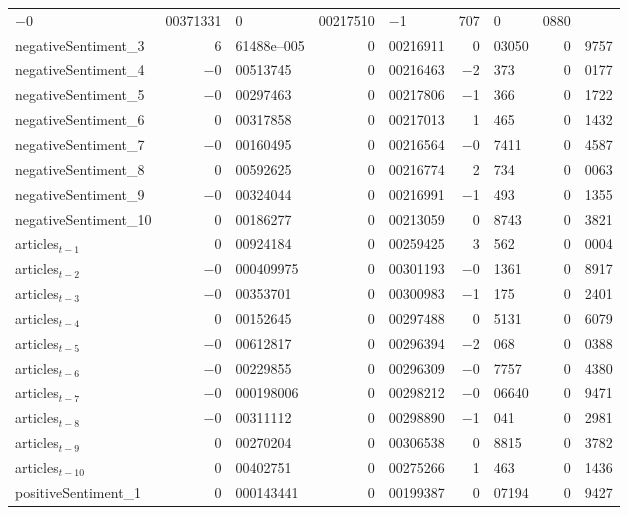 \begin{center}
\begin{longtable}{lr@{.}lr@{.}lr@{.}lr@{.}l}
    $-$0&00371331 &
    0&00217510 &
        $-$1&707 &
        0&0880 \\
negativeSentiment\_3 &
    6&61488\textrm{e--005} &
    0&00216911 &
        0&03050 &
        0&9757 \\
negativeSentiment\_4 &
    $-$0&00513745 &
    0&00216463 &
        $-$2&373 &
        0&0177 \\
negativeSentiment\_5 &
    $-$0&00297463 &
    0&00217806 &
        $-$1&366 &
        0&1722 \\
negativeSentiment\_6 &
    0&00317858 &
    0&00217013 &
        1&465 &
        0&1432 \\
negativeSentiment\_7 &
    $-$0&00160495 &
    0&00216564 &
        $-$0&7411 &
        0&4587 \\
negativeSentiment\_8 &
    0&00592625 &
    0&00216774 &
        2&734 &
        0&0063 \\
negativeSentiment\_9 &
    $-$0&00324044 &
    0&00216991 &
        $-$1&493 &
        0&1355 \\
negativeSentiment\_10 &
    0&00186277 &
    0&00213059 &
        0&8743 &
        0&3821 \\
articles$_{t-1}$ &
    0&00924184 &
    0&00259425 &
        3&562 &
        0&0004 \\
articles$_{t-2}$ &
    $-$0&000409975 &
    0&00301193 &
        $-$0&1361 &
        0&8917 \\
articles$_{t-3}$ &
    $-$0&00353701 &
    0&00300983 &
        $-$1&175 &
        0&2401 \\
articles$_{t-4}$ &
    0&00152645 &
    0&00297488 &
        0&5131 &
        0&6079 \\
articles$_{t-5}$ &
    $-$0&00612817 &
    0&00296394 &
        $-$2&068 &
        0&0388 \\
articles$_{t-6}$ &
    $-$0&00229855 &
    0&00296309 &
        $-$0&7757 &
        0&4380 \\
articles$_{t-7}$ &
    $-$0&000198006 &
    0&00298212 &
        $-$0&06640 &
        0&9471 \\
articles$_{t-8}$ &
    $-$0&00311112 &
    0&00298890 &
        $-$1&041 &
        0&2981 \\
articles$_{t-9}$ &
    0&00270204 &
    0&00306538 &
        0&8815 &
        0&3782 \\
articles$_{t-10}$ &
    0&00402751 &
    0&00275266 &
        1&463 &
        0&1436 \\
positiveSentiment\_1 &
    0&000143441 &
    0&00199387 &
        0&07194 &
        0&9427 \\

\end{longtable}
\end{center}
